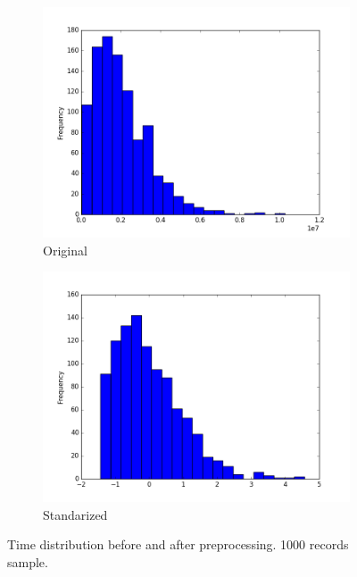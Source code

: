 \documentclass{article}
\begin{document}
\begin{figure}[H]
  \centering
  \begin{subfigure}[b]{.45\textwidth}
  	\centering
  	\includegraphics[width=\linewidth]{./images/time_hist.png}
  	\caption{Original}
  \end{subfigure}
  \begin{subfigure}[b]{.45\textwidth}
  	\centering
  	\includegraphics[width=\linewidth]{./images/time_standarized_hist.png}
  	\caption{Standarized}
  \end{subfigure}
  \caption{Time distribution before and after preprocessing. 1000 records sample.}
  	\label{fig:preprocessing/time}
\end{figure}
\end{document}
